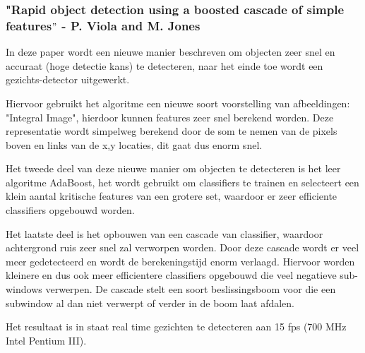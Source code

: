\documentclass[]{article}
\begin{document}
\subsubsection*{"Rapid object detection using a boosted cascade of simple features$"$ - P. Viola and M. Jones}
In deze paper wordt een nieuwe manier beschreven om objecten zeer snel en accuraat (hoge detectie kans) te detecteren, naar het einde toe wordt een gezichts-detector uitgewerkt.
\par
Hiervoor gebruikt het algoritme een nieuwe soort voorstelling van afbeeldingen: "Integral Image", hierdoor kunnen features zeer snel berekend worden. Deze representatie wordt simpelweg berekend door de som te nemen van de pixels boven en links van de x,y locaties, dit gaat dus enorm snel.
\par
Het tweede deel van deze nieuwe manier om objecten te detecteren is het leer algoritme AdaBoost, het wordt gebruikt om classifiers te trainen en selecteert een klein aantal kritische features van een grotere set, waardoor er zeer efficiente classifiers opgebouwd worden.
\par
Het laatste deel is het opbouwen van een cascade van classifier, waardoor achtergrond ruis zeer snel zal verworpen worden. Door deze cascade wordt er veel meer gedetecteerd en wordt de berekeningstijd enorm verlaagd. Hiervoor worden kleinere en dus ook meer efficientere classifiers opgebouwd die veel negatieve sub-windows verwerpen. De cascade stelt een soort beslissingsboom voor die een subwindow al dan niet verwerpt of verder in de boom laat afdalen.
\par
Het resultaat is in staat real time gezichten te detecteren aan 15 fps (700 MHz Intel Pentium III).
\end{document}
